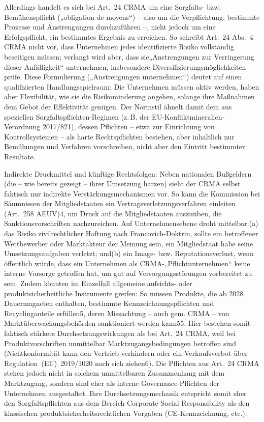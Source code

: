 \documentclass[12pt,a4paper,oneside]{book} %
\begin{document}
Allerdings handelt es sich bei Art. 24 CRMA um eine Sorgfalts- bzw. Bemühenspflicht („obligation de moyens“) – also um die Verpflichtung, bestimmte Prozesse und Anstrengungen durchzuführen –, nicht jedoch um eine Erfolgspflicht, ein bestimmtes Ergebnis zu erreichen. So schreibt Art. 24 Abs. 4 CRMA nicht vor, dass Unternehmen jedes identifizierte Risiko vollständig beseitigen müssen; verlangt wird aber, dass sie„Anstrengungen zur Verringerung dieser Anfälligkeit“ unternehmen, insbesondere Diversifizierungsmöglichkeiten prüfe. Diese Formulierung („Anstrengungen unternehmen“) deutet auf einen qualifizierten Handlungsspielraum: Die Unternehmen müssen aktiv werden, haben aber Flexibilität, wie sie die Risikominderung angehen, solange ihre Maßnahmen dem Gebot der Effektivität genügen. Der Normstil ähnelt damit dem aus speziellen Sorgfaltspflichten-Regimen (z. B. der EU-Konfliktmineralien-Verordnung 2017/821), dessen Pflichten – etwa zur Einrichtung von Kontrollsystemen – als harte Rechtspflichten bestehen, aber inhaltlich nur Bemühungen und Verfahren vorschreiben, nicht aber den Eintritt bestimmter Resultate.

Indirekte Druckmittel und künftige Rechtsfolgen: Neben nationalen Bußgeldern (die – wie bereits gezeigt – ihrer Umsetzung harzen) sieht der CRMA selbst faktisch nur indirekte Verstärkungsmechanismen vor. So kann die Kommission bei Säumnissen der Mitgliedstaaten ein Vertragsverletzungsverfahren einleiten (Art. 258 AEUV)4, um Druck auf die Mitgliedstaaten auszuüben, die Sanktionsvorschriften nachzureichen. Auf Unternehmensebene droht mittelbar:(a) das Risiko zivilrechtlicher Haftung nach Francovich-Doktrin, sollte ein betroffener Wettbewerber oder Marktakteur der Meinung sein, ein Mitgliedstaat habe seine Umsetzungsaufgaben verletzt; und(b) ein Image- bzw. Reputationsverlust, wenn öffentlich würde, dass ein Unternehmen als CRMA-„Pflichtunternehmen“ keine interne Vorsorge getroffen hat, um gut auf Versorgungsstörungen vorbereitet zu sein. Zudem könnten im Einzelfall allgemeine aufsichts- oder produktsicherheitliche Instrumente greifen: So müssen Produkte, die ab 2028 Dauermagneten enthalten, bestimmte Kennzeichnungspflichten und Recyclinganteile erfüllen5, deren Missachtung – auch gem. CRMA – von Marktüberwachungsbehörden sanktioniert werden kann55. Hier bestehen somit faktisch stärkere Durchsetzungswirkungen als bei Art. 24 CRMA, weil bei Produktvorschriften unmittelbar Marktzugangsbedingungen betroffen sind (Nichtkonformität kann den Vertrieb verhindern oder ein Verkaufsverbot über Regulation (EU) 2019/1020 nach sich ziehen6). Die Pflichten aus Art. 24 CRMA stehen jedoch nicht in solchem unmittelbaren Zusammenhang mit dem Marktzugang, sondern sind eher als interne Governance-Pflichten der Unternehmen ausgestaltet. Ihre Durchsetzungsmechanik entspricht somit eher den Sorgfaltspflichten aus dem Bereich Corporate Social Responsibility als den klassischen produktsicherheitsrechtlichen Vorgaben (CE-Kennzeichnung, etc.).
\end{document}
